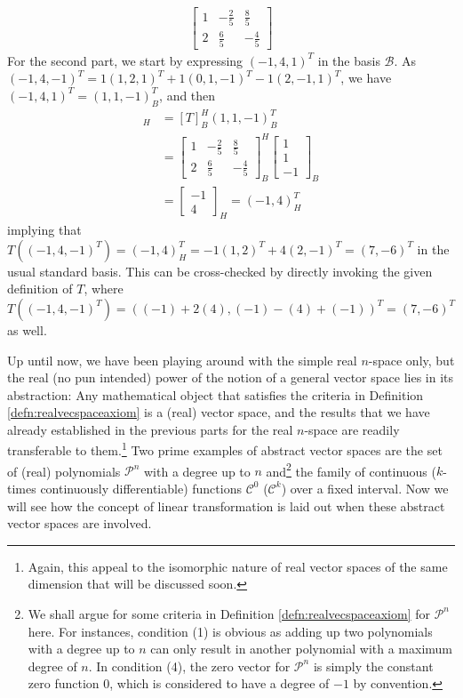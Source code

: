 \begin{solution}
\begin{align*}
\begin{bmatrix}
1 & -\frac{2}{5} & \frac{8}{5} \\
2 & \frac{6}{5} & -\frac{4}{5}
\end{bmatrix}
\end{align*}
For the second part, we start by expressing $(-1,4,1)^T$ in the basis $\mathcal{B}$. As $(-1,4,-1)^T = 1(1,2,1)^T + 1(0,1,-1)^T - 1(2,-1,1)^T$, we have $(-1,4,1)^T = (1,1,-1)_B^T$, and then
\begin{align*}
[T((1,1,-1)_B^T)]_H &= [T]_B^H (1,1,-1)_B^T \\
&=
\begin{bmatrix}
1 & -\frac{2}{5} & \frac{8}{5} \\
2 & \frac{6}{5} & -\frac{4}{5}
\end{bmatrix}_B^H
\begin{bmatrix}
1 \\
1 \\
-1
\end{bmatrix}_B \\
&=
\begin{bmatrix}
-1 \\
4
\end{bmatrix}_H = (-1,4)^T_H
\end{align*}
implying that $T((-1,4,-1)^T) = (-1,4)_H^T = -1(1,2)^T + 4(2,-1)^T = (7,-6)^T$ in the usual standard basis. This can be cross-checked by directly invoking the given definition of $T$, where $T((-1,4,-1)^T) = ((-1)+2(4), (-1)-(4)+(-1))^T = (7,-6)^T$ as well.
\end{solution}

Up until now, we have been playing around with the simple real $n$-space only, but the real (no pun intended) power of the notion of a general vector space lies in its abstraction: Any mathematical object that satisfies the criteria in Definition \ref{defn:realvecspaceaxiom} is a (real) vector space, and the results that we have already established in the previous parts for the real $n$-space are readily transferable to them.\footnote{Again, this appeal to the isomorphic nature of real vector spaces of the same dimension that will be discussed soon.} Two prime examples of abstract vector spaces are the set of (real) polynomials $\mathcal{P}^n$ with a degree up to $n$ and\footnote{We shall argue for some criteria in Definition \ref{defn:realvecspaceaxiom} for $\mathcal{P}^n$ here. For instances, condition (1) is obvious as adding up two polynomials with a degree up to $n$ can only result in another polynomial with a maximum degree of $n$. In condition (4), the zero vector for $\mathcal{P}^n$ is simply the constant zero function $0$, which is considered to have a degree of $-1$ by convention.} the family of continuous ($k$-times continuously differentiable) functions $\mathcal{C}^0$ ($\mathcal{C}^k$) over a fixed interval. Now we will see how the concept of linear transformation is laid out when these abstract vector spaces are involved.

